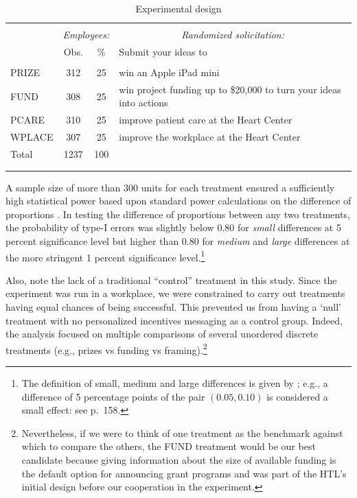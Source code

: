 \documentclass[12pt, titlepage]{article}
\begin{document}
\begin{table}
\centering
\caption{Experimental design}
\label{experimental-design}
\begin{tabular}{@{}lccp{10cm}}
  \\[-1.8ex]\hline \hline \\[-1.8ex]
 & \multicolumn{2}{c}{\emph{Employees:}}& \multicolumn{1}{c}{\emph{Randomized solicitation:}}\\
 \cmidrule(lr){2-3} & Obs. & \% & Submit your ideas to \\ 
  \hline \\[-1.86ex]
PRIZE & 312 & 25 & win an Apple iPad mini \\ 
  [1.8ex] FUND & 308 & 25 & win project funding up to \$20,000 to turn your ideas into actions \\ 
  [1.8ex] PCARE & 310 & 25 & improve patient care at the Heart Center \\ 
  [1.8ex] WPLACE & 307 & 25 & improve the workplace at the Heart Center \\ 
  [1.8ex] Total & 1237 & 100 &  \\ 
   \\[-1.8ex]\hline \hline \\[-1.8ex]
\end{tabular}
\end{table}

A sample size of more than 300 units for each treatment ensured a
sufficiently high statistical power based upon standard power
calculations on the difference of proportions \citep{cohen1992power}. In
testing the difference of proportions between any two treatments, the
probability of type-I errors was slightly below \(0.80\) for
\emph{small} differences at 5 percent significance level but higher than
\(0.80\) for \emph{medium} and \emph{large} differences at the more
stringent 1 percent significance level.\footnote{The definition of
  small, medium and large differences is given by
  \citet{cohen1992power}; e.g., a difference of 5 percentage points of
  the pair \((0.05, 0.10)\) is considered a small effect: see
  \citet{cohen1992power} p.~158.}

Also, note the lack of a traditional ``control'' treatment in this
study. Since the experiment was run in a workplace, we were constrained
to carry out treatments having equal chances of being successful. This
prevented us from having a `null' treatment with no personalized
incentives messaging as a control group. Indeed, the analysis focused on
multiple comparisons of several unordered discrete treatments (e.g.,
prizes vs funding vs framing).\footnote{Nevertheless, if we were to
  think of one treatment as the benchmark against which to compare the
  others, the FUND treatment would be our best candidate because giving
  information about the size of available funding is the default option
  for announcing grant programs and was part of the HTL's initial design
  before our cooperation in the experiment.}
\end{document}
